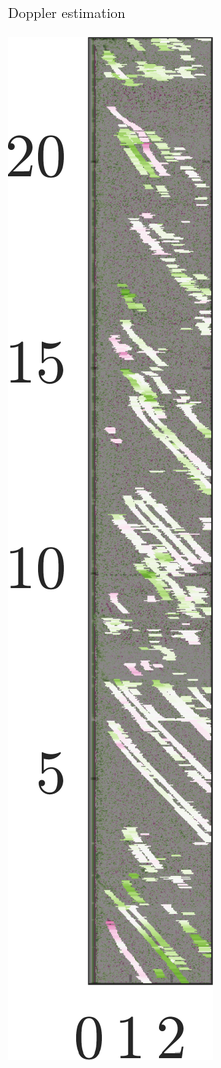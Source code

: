 \begin{figure}[htbp]
\begin{subfigure}[t]{0.32\linewidth}
        \caption{\small Doppler estimation}
    \end{subfigure}%
    \hfill%
    \begin{subfigure}[t]{0.32\linewidth}   
        \centering 
        \includegraphics[width=\linewidth]{gfx/results/sauna_doa.png}

\end{subfigure}
\end{figure}

